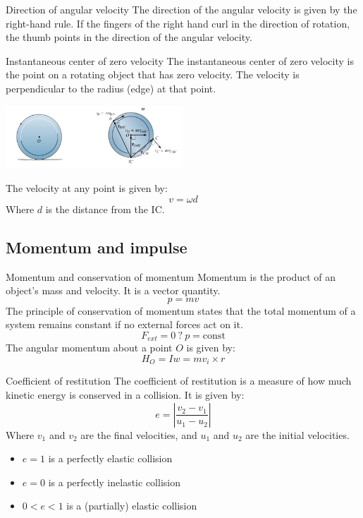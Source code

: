 \begin{knBox}
    {Direction of angular velocity}
    The direction of the angular velocity is given by the right-hand rule. If the fingers of the right hand curl in the direction of rotation, the thumb points in the direction of the angular velocity.
\end{knBox}

\begin{knBox}
    {Instantaneous center of zero velocity}
    The instantaneous center of zero velocity is the point on a rotating object that has zero velocity. The velocity is perpendicular to the radius (edge) at that point.
    \begin{center}
        \includegraphics[width=0.5\textwidth]{./img/ic.png}
    \end{center}
    The velocity at any point is given by:
    \[v=\omega d\]
    Where $d$ is the distance from the IC.
\end{knBox}

\subsection{Momentum and impulse}

\begin{definition}
    {Momentum and conservation of momentum}
    Momentum is the product of an object's mass and velocity. It is a vector quantity.
    \[p=mv\]
    The principle of conservation of momentum states that the total momentum of a system remains constant if no external forces act on it.
    \[F_{ext}=0\ ?\ p=\text{const}\]
    The angular momentum about a point $O$ is given by:
    \[H_O=Iw=mv_i\times r\]
\end{definition}

\begin{theorem}
    {Coefficient of restitution}
    The coefficient of restitution is a measure of how much kinetic energy is conserved in a collision. It is given by:
    \[e=|\frac{v_{2}-v_{1}}{u_{1}-u_{2}}|\]
    Where $v_{1}$ and $v_{2}$ are the final velocities, and $u_{1}$ and $u_{2}$ are the initial velocities.
    \begin{itemize}
        \item $e=1$ is a perfectly elastic collision
        \item $e=0$ is a perfectly inelastic collision
        \item $0<e<1$ is a (partially) elastic collision
    \end{itemize}
\end{theorem}

